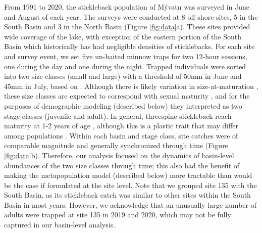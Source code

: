 \documentclass[11pt]{article}
\begin{document}
From 1991 to 2020, 
the stickleback population of M\'{y}vatn was surveyed in June and August of each year. 
The surveys were conducted at 8 off-shore sites, 
5 in the South Basin and 3 in the North Basin
(Figure \ref{fig:data}a).
These sites provided wide coverage of the lake,
with exception of the eastern portion of the South Basin 
which historically has had negligible densities of sticklebacks.
For each site and survey event, 
we set five un-baited minnow traps for two 12-hour sessions, 
one during the day and one during the night. 
Trapped individuals were sorted into two size classes (small and large)
with a threshold of 50mm in June and 45mm in July, based on \citep{gislason1998}. 
Although there is likely variation in size-at-maturation \citep{singkam2019},
these size classes are expected to correspond with sexual maturity 
\citep{gudmundsson1996, gislason1998},
and for the purposes of demographic modeling (described below) 
they interpreted as two stage-classes (juvenile and adult).
In general, threespine stickleback reach maturity at 1-2 years of age
\citep{heins2008overview},
although this is a plastic trait \citep{baker2015life}
that may differ among populations \citep{snyder1991migration}.
Within each basin and stage class, 
site catches were of comparable magnitude and 
generally synchronized through time (Figure \ref{fig:data}b).
Therefore, our analysis focused on the dynamics of basin-level abundances
of the two size classes through time;
this also had the benefit of making the metapopulation model (described below) more tractable
than would be the case if formulated at the site level.
Note that we grouped site 135 with the South Basin, 
as its stickleback catch was similar to other sites within the South Basin in most years.
However, 
we acknowledge that an unusually large number of adults were trapped at site 135
in 2019 and 2020, which may not be fully captured in our basin-level analysis.
\end{document}
